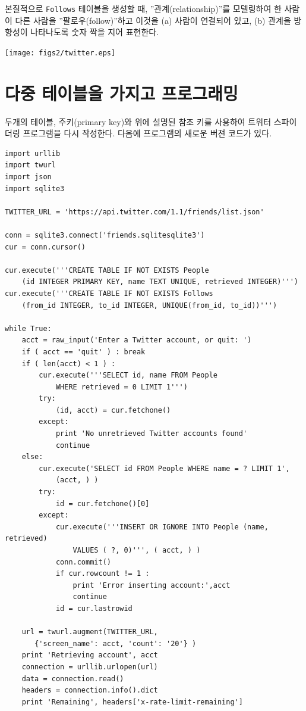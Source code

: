 본질적으로 {\tt Follows} 테이블을 생성할 때, ''관계(relationship)''를 모델링하여 한 사람이 다른 사람을 ''팔로우(follow)''하고
이것을 (a) 사람이 연결되어 있고, (b) 관계을 방향성이 나타나도록 숫자 짝을 지어 표현한다.  

\beforefig
\centerline{\texttt{[image: figs2/twitter.eps]}}
\afterfig

\section{다중 테이블을 가지고 프로그래밍}
두개의 테이블, 주키(primary key)와 위에 설명된 참조 키를 사용하여 트위터 스파이더링 프로그램을 다시 작성한다.
다음에 프로그램의 새로운 버젼 코드가 있다.

\beforeverb
\begin{verbatim}
import urllib
import twurl
import json
import sqlite3

TWITTER_URL = 'https://api.twitter.com/1.1/friends/list.json'

conn = sqlite3.connect('friends.sqlitesqlite3')
cur = conn.cursor()

cur.execute('''CREATE TABLE IF NOT EXISTS People 
    (id INTEGER PRIMARY KEY, name TEXT UNIQUE, retrieved INTEGER)''')
cur.execute('''CREATE TABLE IF NOT EXISTS Follows 
    (from_id INTEGER, to_id INTEGER, UNIQUE(from_id, to_id))''')

while True:
    acct = raw_input('Enter a Twitter account, or quit: ')
    if ( acct == 'quit' ) : break
    if ( len(acct) < 1 ) :
        cur.execute('''SELECT id, name FROM People 
            WHERE retrieved = 0 LIMIT 1''')
        try:
            (id, acct) = cur.fetchone()
        except:
            print 'No unretrieved Twitter accounts found'
            continue
    else:
        cur.execute('SELECT id FROM People WHERE name = ? LIMIT 1', 
            (acct, ) )
        try:
            id = cur.fetchone()[0]
        except:
            cur.execute('''INSERT OR IGNORE INTO People (name, retrieved) 
                VALUES ( ?, 0)''', ( acct, ) )
            conn.commit()
            if cur.rowcount != 1 : 
                print 'Error inserting account:',acct
                continue
            id = cur.lastrowid

    url = twurl.augment(TWITTER_URL, 
       {'screen_name': acct, 'count': '20'} )
    print 'Retrieving account', acct
    connection = urllib.urlopen(url)
    data = connection.read()
    headers = connection.info().dict
    print 'Remaining', headers['x-rate-limit-remaining']


\end{verbatim}
